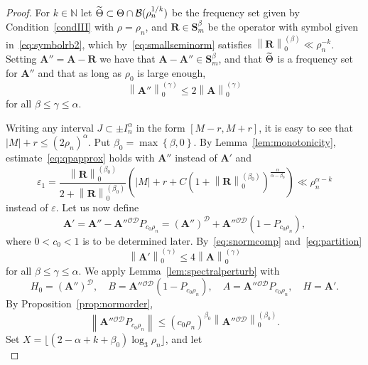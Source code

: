\documentclass[AHL,Unicode,longabstracts,published]{cedram}
\newcommand{\N}{\mathbb N}
\newcommand{\CB}{\mathcal{B}}
\newcommand{\CD}{\mathcal{D}}
\newcommand{\CO}{\mathcal{O}}
\newcommand{\BA}{\mathbf A}
\newcommand{\BS}{\mathbf S}
\newcommand{\BR}{\mathbf R}
\newcommand{\eps}{\varepsilon}
\newcommand{\abs}[1]{\left\lvert #1 \right\rvert}
\newcommand{\set}[1]{\left\{ #1 \right\}}
\newcommand{\norm}[1]{\left\| #1 \right\|}
\newcommand{\snorm}[3]{\left\| #1\right\|_{#3}^{(#2)}}
\let\oldtilde\tilde
\renewcommand*{\tilde}[1]{\mathchoice{\widetilde{#1}}{\widetilde{#1}}{\oldtilde{#1}}{\oldtilde{#1}}}
\begin{document}
\begin{proof}
For $k \in \N$ let $\tilde \Theta \subset \Theta \cap \CB(\rho_n^{1/k})$ be the frequency set given by Condition~\ref{condIII} with $\rho = \rho_n$, and $\BR \in \BS^\beta_m$ be the operator with symbol given in~\eqref{eq:symbolrb2}, which by~\eqref{eq:smallseminorm} satisfies $\snorm{\BR}{\beta}{0}
\ll \rho_n^{-k}$. Setting $\BA'' = \BA - \BR$ we have that $\BA - \BA'' \in
\BS_m^{\beta}$, and that $\tilde \Theta$ is a frequency set for $\BA''$ and that as long as $\rho_0$ is large enough,
\begin{equation}\label{eq:snormcomp}
\snorm{\BA''}{\gamma}{0} \le 2 \snorm{\BA}{\gamma}{0}
\end{equation}
for all $\beta \le \gamma \le \alpha$.

Writing any interval $J \subset \pm I_n^\alpha$ in the form $[M - r,M+r]$, it is easy to see that $\abs M + r \le (2 \rho_n)^\alpha$. Put $\beta_0 = \max\set{\beta,0}$. By Lemma~\ref{lem:monotonicity}, estimate~\eqref{eq:qpapprox} holds with $\BA''$ instead of $\BA'$ and
\begin{equation}
\eps_1 = \frac{\snorm{\BR}{\beta_0}{0}}{2 + \snorm{\BR}{\beta_0}{0}}\left(\abs M + r + C\left(1 +
\snorm{\BR}{\beta_0}{0}\right)^\frac{\alpha}{\alpha - \beta_0}\right) \ll \rho_n^{\alpha - k}
\end{equation}
instead of $\eps$. Let us now define
\begin{equation}
\BA' = \BA'' - \BA''{}^{\CO\CD}P_{c_0\rho_n} = (\BA'')^\CD +
\BA''{}^{\CO\CD}(1 - P_{c_0 \rho_n}),
\end{equation}
where $0 < c_0 < 1$ is to be determined later. By~\eqref{eq:snormcomp} and~\eqref{eq:partition}
\begin{equation}
\snorm{\BA'}{\gamma}{0} \le 4 \snorm{\BA}{\gamma}{0}
\end{equation}
for all $\beta \le \gamma \le \alpha$. We apply Lemma~\ref{lem:spectralperturb} with
\begin{equation}
H_0 = (\BA'')^{\CD}, \quad B = \BA''{}^{\CO\CD}(1 - P_{c_0\rho_n}), \quad A =
\BA''{}^{\CO\CD}P_{c_0\rho_n}, \quad H = \BA'.
\end{equation}
By Proposition~\ref{prop:normorder},
\begin{equation}
\norm{\BA''{}^{\CO\CD}P_{c_0\rho_n}} \le (c_0 \rho_n)^{\beta_0}
\snorm{\BA''{}^{\CO\CD}}{\beta_0}{0}.
\end{equation}
Set $X = \lfloor (2 - \alpha + k + \beta_0) \log_3 \rho_n \rfloor$, and let
\begin{equation}\label{eq:increasingproj}

\end{equation}
\end{proof}
\end{document}
